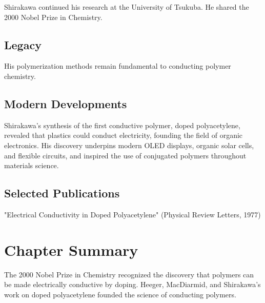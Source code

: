 Shirakawa continued his research at the University of Tsukuba. He shared the 2000 Nobel Prize in Chemistry.

\subsection*{Legacy}

His polymerization methods remain fundamental to conducting polymer chemistry.

\subsection*{Modern Developments}

Shirakawa's synthesis of the first conductive polymer, doped polyacetylene, revealed that plastics could conduct electricity, founding the field of organic electronics. His discovery underpins modern OLED displays, organic solar cells, and flexible circuits, and inspired the use of conjugated polymers throughout materials science.

\subsection*{Selected Publications}

"Electrical Conductivity in Doped Polyacetylene" (Physical Review Letters, 1977)

\clearpage

\section*{Chapter Summary}

The 2000 Nobel Prize in Chemistry recognized the discovery that polymers can be made electrically conductive by doping. Heeger, MacDiarmid, and Shirakawa's work on doped polyacetylene founded the science of conducting polymers.
